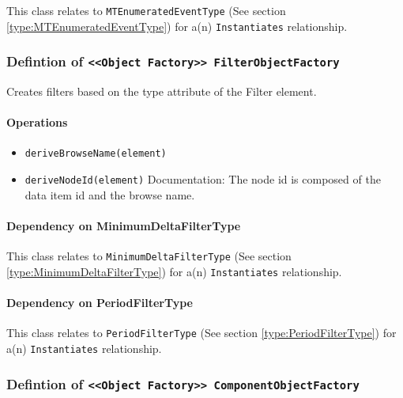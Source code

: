 This class relates to \texttt{MTEnumeratedEventType} (See section \ref{type:MTEnumeratedEventType}) for a(n) \texttt{Instantiates} relationship.

\FloatBarrier
\subsubsection{Defintion of \texttt{<<Object Factory>> FilterObjectFactory}} \label{type:FilterObjectFactory}

\FloatBarrier

Creates filters based on the type attribute of the Filter element. 

\paragraph{Operations}
\begin{itemize}
  \item \texttt{deriveBrowseName(element)}
  \item \texttt{deriveNodeId(element)}
    Documentation: The node id is composed of the data item id and the browse name.

\end{itemize}
\paragraph{Dependency on MinimumDeltaFilterType}

This class relates to \texttt{MinimumDeltaFilterType} (See section \ref{type:MinimumDeltaFilterType}) for a(n) \texttt{Instantiates} relationship.

\paragraph{Dependency on PeriodFilterType}

This class relates to \texttt{PeriodFilterType} (See section \ref{type:PeriodFilterType}) for a(n) \texttt{Instantiates} relationship.

\FloatBarrier
\subsubsection{Defintion of \texttt{<<Object Factory>> ComponentObjectFactory}} \label{type:ComponentObjectFactory}

\FloatBarrier




